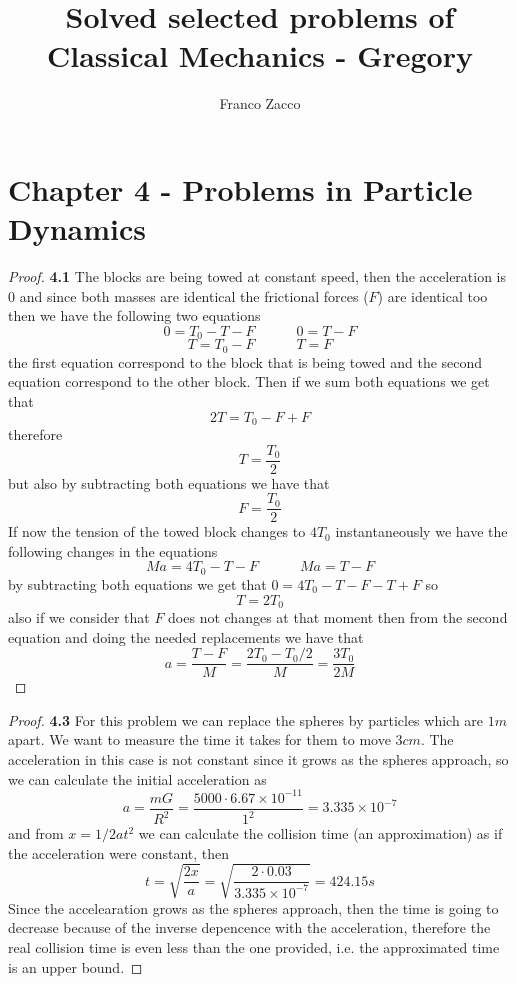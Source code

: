 \documentclass[11pt]{article}
\title{\textbf{Solved selected problems of Classical Mechanics - Gregory}}
\author{Franco Zacco}
\date{}
\theoremstyle{definition}
\begin{document}
\maketitle
\thispagestyle{empty}

\section*{Chapter 4 - Problems in Particle Dynamics}

	\begin{proof}{\textbf{4.1}}
        The blocks are being towed at constant speed, then the acceleration
        is 0 and since both masses are identical the frictional forces ($F$) are
        identical too then we have the following two equations
        $$0 = T_0 - T - F \quad\quad\quad 0 = T - F$$
        $$T = T_0 - F \quad\quad\quad T = F$$
        the first equation correspond to the block that is being towed and the
        second equation correspond to the other block. Then if we sum both
        equations we get that
        $$2T = T_0 - F + F$$
        therefore
        $$T = \frac{T_0}{2}$$
        but also by subtracting both equations we have that
        $$F = \frac{T_0}{2}$$
        If now the tension of the towed block changes to $4T_0$ instantaneously
        we have the following changes in the equations
        $$Ma = 4T_0 - T - F \quad\quad\quad Ma = T - F$$
        by subtracting both equations we get that $0 = 4T_0 - T - F - T + F$
        so
        $$T = 2T_0$$
        also if we consider that $F$ does not changes at that moment then from
        the second equation and doing the needed replacements we have that
        $$a = \frac{T-F}{M} = \frac{2T_0 - T_0/2}{M} = \frac{3T_0}{2M}$$
    \end{proof}
	\begin{proof}{\textbf{4.3}}
        For this problem we can replace the spheres by particles which are
        $1m$ apart. We want to measure the time it takes for them to move
        $3cm$.
        The acceleration in this case is not constant since it grows as the
        spheres approach, so we can calculate the initial acceleration as
        $$a = \frac{mG}{R^2} = \frac{5000 \cdot 6.67 \times 10^{-11}}{1^2} = 3.335 \times 10^{-7}$$
        and from $x = 1/2at^2$ we can calculate the collision time (an
        approximation) as if the acceleration were constant, then
        $$t = \sqrt{\frac{2x}{a}} = \sqrt{\frac{2 \cdot 0.03}{3.335 \times 10^{-7}}} = 424.15 \si{s}$$
        Since the accelearation grows as the spheres approach, then the time is
        going to decrease because of the inverse depencence with the
        acceleration, therefore the real collision time is even less than the
        one provided, i.e. the approximated time is an upper bound.
    \end{proof}
\end{document}
